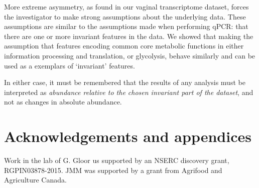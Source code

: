\documentclass[10pt]{article}
\renewcommand{\refname}{\centerline{REFERENCES}}
\begin{document}
More extreme asymmetry, as found in our vaginal transcriptome dataset, forces the investigator to make strong assumptions about the underlying data. These assumptions are similar to the assumptions made when performing qPCR: that there are one or more invariant features in the data. We showed that making the assumption that features encoding common core metabolic functions in either information processing and translation, or glycolysis, behave similarly and can be used as a exemplars of `invariant' features. 

In either case, it must be remembered that the results of any analysis must be interpreted as \emph{abundance relative to the chosen invariant part of the dataset}, and not as changes in absolute abundance.

\section*{Acknowledgements and appendices}
\vskip-0.25cm

Work in the lab of G. Gloor us supported by an NSERC discovery grant, RGPIN03878-2015. JMM was supported by a grant from Agrifood and Agriculture Canada.


\renewcommand\refname{}
\vskip-1cm
% 

\end{document}
